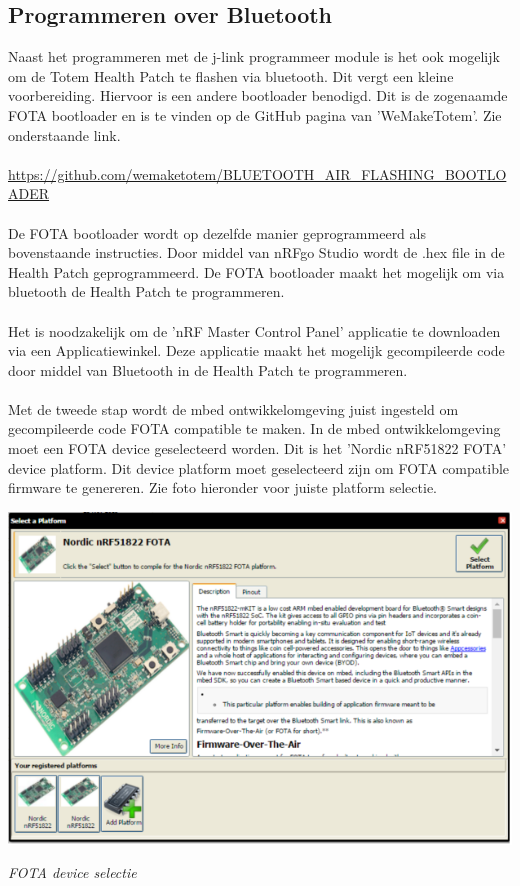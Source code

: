 \documentclass[conference]{IEEEtran}
\begin{document}
\subsection{Programmeren over Bluetooth}
Naast het programmeren met de j-link programmeer module is het ook mogelijk om de Totem Health Patch te flashen via bluetooth. Dit vergt een kleine voorbereiding. Hiervoor is een andere bootloader benodigd. Dit is de zogenaamde FOTA bootloader en is te vinden op de GitHub pagina van 'WeMakeTotem'. Zie onderstaande link.\\\\\url{https://github.com/wemaketotem/BLUETOOTH_AIR_FLASHING_BOOTLOADER 
}\\\\De FOTA bootloader wordt op dezelfde manier geprogrammeerd als bovenstaande instructies. Door middel van nRFgo Studio wordt de .hex file in de Health Patch geprogrammeerd. De FOTA bootloader maakt het mogelijk om via bluetooth de Health Patch te programmeren.\\\\Het is noodzakelijk om de 'nRF Master Control Panel' applicatie te downloaden via een Applicatiewinkel. Deze applicatie maakt het mogelijk gecompileerde code door middel van Bluetooth in de Health Patch te programmeren.\\\\Met de tweede stap wordt de mbed ontwikkelomgeving juist ingesteld om gecompileerde code FOTA compatible te maken. In de mbed ontwikkelomgeving moet een FOTA device geselecteerd worden. Dit is het 'Nordic nRF51822 FOTA' device platform. Dit device platform moet geselecteerd zijn om FOTA compatible firmware te genereren. Zie foto hieronder voor juiste platform selectie.

\begin{center}
    \includegraphics[scale=0.65]{FOTA0}
    \begin{minipage}{0.6\textwidth}
    \footnotesize
    \emph{FOTA device selectie}
    \end{minipage}
\end{center}
\end{document}
